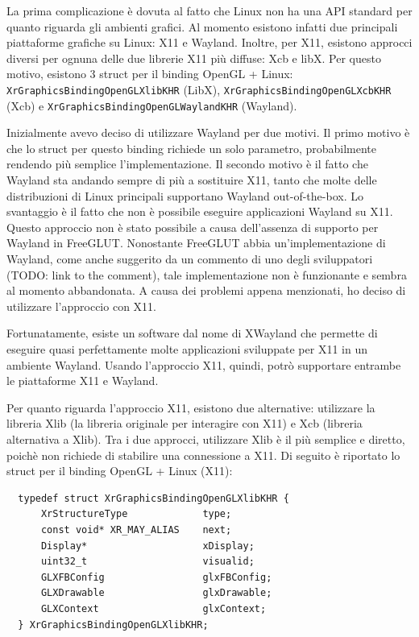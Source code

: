 \documentclass[twoside]{supsistudent}
\begin{document}
La prima complicazione è dovuta al fatto che Linux non ha una API standard per quanto riguarda gli ambienti grafici. Al momento esistono infatti due principali piattaforme grafiche su Linux: X11 e Wayland. Inoltre, per X11, esistono approcci diversi per ognuna delle due librerie X11 più diffuse: Xcb e libX. Per questo motivo, esistono 3 struct per il binding OpenGL + Linux: \texttt{XrGraphicsBindingOpenGLXlibKHR} (LibX), \texttt{XrGraphicsBindingOpenGLXcbKHR} (Xcb) e \texttt{XrGraphicsBindingOpenGLWaylandKHR} (Wayland).

Inizialmente avevo deciso di utilizzare Wayland per due motivi. Il primo motivo è che lo struct per questo binding richiede un solo parametro, probabilmente rendendo più semplice l'implementazione. Il secondo motivo è il fatto che Wayland sta andando sempre di più a sostituire X11, tanto che molte delle distribuzioni di Linux principali supportano Wayland out-of-the-box. Lo svantaggio è il fatto che non è possibile eseguire applicazioni Wayland su X11. Questo approccio non è stato possibile a causa dell'assenza di supporto per Wayland in FreeGLUT. Nonostante FreeGLUT abbia un'implementazione di Wayland, come anche suggerito da un commento di uno degli sviluppatori (TODO: link to the comment), tale implementazione non è funzionante e sembra al momento abbandonata. A causa dei problemi appena menzionati, ho deciso di utilizzare l'approccio con X11.

Fortunatamente, esiste un software dal nome di XWayland che permette di eseguire quasi perfettamente molte applicazioni sviluppate per X11 in un ambiente Wayland. Usando l'approccio X11, quindi, potrò supportare entrambe le piattaforme X11 e Wayland.

Per quanto riguarda l'approccio X11, esistono due alternative: utilizzare la libreria Xlib (la libreria originale per interagire con X11) e Xcb (libreria alternativa a Xlib). Tra i due approcci, utilizzare Xlib è il più semplice e diretto, poichè non richiede di stabilire una connessione a X11. Di seguito
è riportato lo struct per il binding OpenGL + Linux (X11):

\begin{verbatim}
  typedef struct XrGraphicsBindingOpenGLXlibKHR {
      XrStructureType             type;
      const void* XR_MAY_ALIAS    next;
      Display*                    xDisplay;
      uint32_t                    visualid;
      GLXFBConfig                 glxFBConfig;
      GLXDrawable                 glxDrawable;
      GLXContext                  glxContext;
  } XrGraphicsBindingOpenGLXlibKHR;
\end{verbatim}
\end{document}
